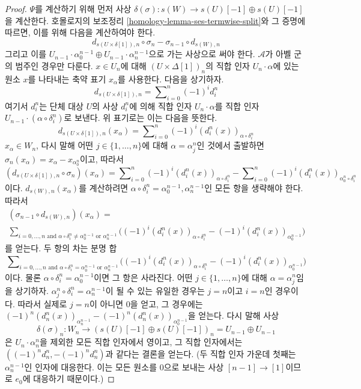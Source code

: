 \begin{proof}
\medskip\noindent
$\Psi$를 계산하기 위해 먼저 사상
$\delta(\sigma) : s(W) \to s(U)[-1] \oplus s(U)[-1]$을 계산한다.
호몰로지의 보조정리 \ref{homology-lemma-ses-termwise-split}와 그 증명에
따르면, 이를 위해 다음을 계산하여야 한다.
$$
d_{s(U \times \delta[1]), n} \circ \sigma_n
-
\sigma_{n - 1} \circ d_{s(W), n}
$$
그리고 이를
$U_{n - 1} \cdot \alpha^{n - 1}_0 \oplus U_{n - 1} \cdot \alpha^{n - 1}_n$으로
가는 사상으로 써야 한다. $\mathcal{A}$가 아벨 군의 범주인 경우만
다룬다. $x \in U_n$에 대해 $(U \times \Delta[1])_n$의 직합 인자
$U_n \cdot \alpha$에 있는 원소 $x$를 나타내는 축약 표기
$x_{\alpha}$를 사용한다. 다음을 상기하자.
$$
d_{s(U \times \delta[1]), n}
=
\sum\nolimits_{i = 0}^n (-1)^i d^n_i
$$
여기서 $d^n_i$는 단체 대상 $U$의 사상 $d^n_i$에 의해 직합 인자
$U_n \cdot \alpha$를 직합 인자
$U_{n - 1} \cdot (\alpha \circ \delta^n_i)$로 보낸다.
위 표기로는 이는 다음을 뜻한다.
$$
d_{s(U \times \delta[1]), n}(x_\alpha) =
\sum\nolimits_{i = 0}^n (-1)^i (d^n_i(x))_{\alpha \circ \delta^n_i}
$$
$x_\alpha \in W_n$, 다시 말해 어떤 $j \in \{1, \ldots, n\}$에 대해
$\alpha = \alpha^n_j$인 것에서 출발하면
$\sigma_n(x_\alpha) = x_\alpha - x_{\alpha^n_0}$이고, 따라서
$$
(d_{s(U \times \delta[1]), n} \circ \sigma_n)(x_\alpha)
=
\sum\nolimits_{i = 0}^n (-1)^i (d^n_i(x))_{\alpha \circ \delta^n_i}
-
\sum\nolimits_{i = 0}^n (-1)^i (d^n_i(x))_{\alpha^n_0 \circ \delta^n_i}
$$
이다. $d_{s(W), n}(x_\alpha)$를 계산하려면
$\alpha \circ \delta^n_i = \alpha^{n - 1}_0, \alpha^{n - 1}_n$인 모든
항을 생략해야 한다. 따라서
$$
\begin{matrix}
(\sigma_{n - 1} \circ d_{s(W), n})(x_\alpha) = \\
\sum\nolimits_{i = 0, \ldots, n\text{ and }
\alpha \circ \delta^n_i \not = \alpha^{n - 1}_0\text{ or }\alpha^{n - 1}_n}
\Big((-1)^i (d^n_i(x))_{\alpha \circ \delta^n_i}
-
(-1)^i (d^n_i(x))_{\alpha^{n - 1}_0}
\Big)
\end{matrix}
$$
를 얻는다. 두 항의 차는 분명 합
$$
\sum\nolimits_{i = 0, \ldots, n\text{ and }
\alpha \circ \delta^n_i = \alpha^{n - 1}_0\text{ or }\alpha^{n - 1}_n}
\Big((-1)^i (d^n_i(x))_{\alpha \circ \delta^n_i}
-
(-1)^i (d^n_i(x))_{\alpha^{n - 1}_0}
\Big)
$$
이다. 물론 $\alpha \circ \delta^n_i = \alpha^{n - 1}_0$이면 그 항은
사라진다. 어떤 $j \in \{1, \ldots, n\}$에 대해
$\alpha = \alpha^n_j$임을 상기하자.
$\alpha^n_j \circ \delta^n_i = \alpha^{n - 1}_n$이 될 수 있는 유일한
경우는 $j = n$이고 $i = n$인 경우이다. 따라서 실제로 $j = n$이
아니면 $0$을 얻고, 그 경우에는
$(-1)^n(d^n_n(x))_{\alpha^{n - 1}_n} - (-1)^n(d^n_n(x))_{\alpha^{n - 1}_0}$을
얻는다. 다시 말해 사상
$$
\delta(\sigma)_n :
W_n
\to
(s(U)[-1] \oplus s(U)[-1])_n = U_{n - 1} \oplus U_{n - 1}
$$
은 $U_n \cdot \alpha^n_n$을 제외한 모든 직합 인자에서 영이고,
그 직합 인자에서는 $((-1)^nd^n_n, -(-1)^nd^n_n)$과 같다는 결론을
얻는다. (두 직합 인자 가운데 첫째는 $\alpha^{n - 1}_n$인 인자에
대응한다. 이는 모든 원소를 $0$으로 보내는 사상
$[n - 1] \to [1]$이므로 $e_0$에 대응하기 때문이다.)


\end{proof}
